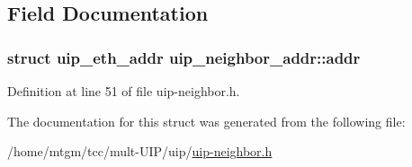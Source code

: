 \subsection{Field Documentation}
\hypertarget{structuip__neighbor__addr_a4dc3294d67d705f7248ef57e4259424f}{
\subsubsection[{addr}]{\setlength{\rightskip}{0pt plus 5cm}struct {\bf uip\_\-eth\_\-addr} {\bf uip\_\-neighbor\_\-addr::addr}}}
\label{structuip__neighbor__addr_a4dc3294d67d705f7248ef57e4259424f}


Definition at line 51 of file uip-\/neighbor.h.



The documentation for this struct was generated from the following file:\begin{DoxyCompactItemize}
\item 
/home/mtgm/tcc/mult-\/UIP/uip/\hyperlink{uip-neighbor_8h}{uip-\/neighbor.h}\end{DoxyCompactItemize}
